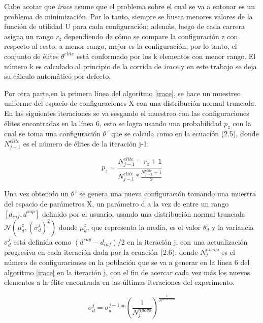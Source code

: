Cabe acotar que \emph{irace} asume que el problema sobre el cual se va a entonar es un problema de minimización. Por lo tanto, siempre se busca menores valores de la función de utilidad U para cada configuración; además, luego de cada carrera asigna un rango $r_z$ dependiendo de cómo se compare la configuración z con respecto al resto, a menor rango, mejor es la configuración, por lo tanto, el conjunto de élites $\theta^{elite}$ está conformado por los k elementos con menor rango. El número k es calculado al principio de la corrida de \emph{irace} y en este trabajo se deja su cálculo automático por defecto.

Por otra parte,en la primera línea del algoritmo \ref{irace}, se hace un muestreo uniforme del espacio de configuraciones X con una distribución normal truncada. En las siguientes iteraciones se va sesgando el muestreo con las configuraciones élites encontradas en la línea 6, esto se logra usando una probabilidad $p_z$ con la cual se toma una configuración $ \theta^z$ que se calcula como en la ecuación (2.5), donde $N^{elite}_{j-1}$ es el número de élites de la iteración j-1:

\begin{equation}
p_z = \frac{N^{elite}_{j-1} - r_z + 1}{N^{elite}_{j-1}*\frac{N^{elite}_{j-1}+1}{2}}
\end{equation} 

Una vez obtenido un $\theta^z$ se genera una nueva configuración tomando una muestra del espacio de parámetros X, un parámetro d a la vez de entre un rango $[d_{inf},d^{sup}]$ definido por el usuario, usando una distribución normal truncada $\mathcal{N}(\mu^z_d,(\sigma^j_d)^2)$ donde $\mu^z_d$, que representa la media, es el valor $\theta^z_d$ y la variancia $\sigma^j_d$ está definida como $(d^{sup}-d_{inf}) / 2 $ en la iteración j, con una actualización progresiva  en cada iteración dada por la ecuación (2.6), donde $N^{nuevo}_j$ es el número de configuraciones en la población que se va a generar en la línea 6 del algoritmo \ref{irace} en la iteración j, con el fin de acercar cada vez más los nuevos elementos a la élite encontrada en las últimas iteraciones del experimento.

\begin{equation}
\sigma^j_d = \sigma^{j-1}_d *\left(\frac{1}{N^{nuevo}_j}\right)^{\frac{1}{N^{parametros}}}
\end{equation}

